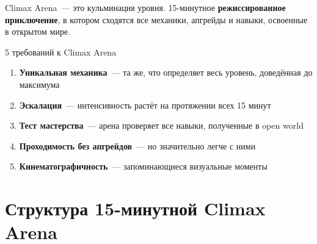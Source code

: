 \documentclass[a4paper,11pt]{report}
\begin{document}
Climax Arena~--- это кульминация уровня. 15-минутное
\textbf{режиссированное приключение}, в котором сходятся все механики,
апгрейды и навыки, освоенные в открытом мире.

\begin{principle}{5 требований к Climax Arena}
\begin{enumerate}
  \item \textbf{Уникальная механика}~--- та же, что определяет весь уровень,
    доведённая до максимума
  \item \textbf{Эскалация}~--- интенсивность растёт на протяжении всех 15 минут
  \item \textbf{Тест мастерства}~--- арена проверяет все навыки,
    полученные в open world
  \item \textbf{Проходимость без апгрейдов}~--- но значительно легче с ними
  \item \textbf{Кинематографичность}~--- запоминающиеся визуальные моменты
\end{enumerate}
\end{principle}

\section{Структура 15-минутной Climax Arena}
\end{document}
